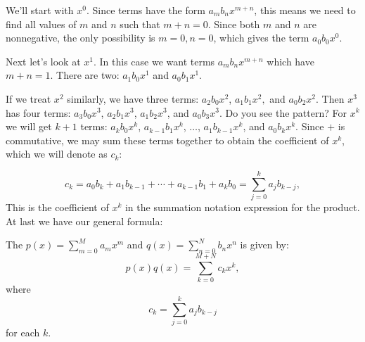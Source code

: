 We'll start with $x^0$. Since terms have the form $a_m b_n x^{m+n}$, this means we need to find all values of $m$ and $n$ such that $m+n=0$.  Since both $m$ and $n$ are nonnegative, the only possibility is $m=0,n=0$, which gives the term $a_0 b_0 x^{0}$.

Next let's look at $x^1$. In this case we want terms $a_m b_n x^{m+n}$ which have $m+n=1$.  There are two: $a_1 b_0 x^{1}$ and $a_0 b_1 x^{1}$.

If we treat $x^2$ similarly, we have three terms: $a_2 b_0 x^{2}$, $a_1 b_1 x^{2}, $  and $a_0 b_2 x^{2}$.  Then $x^3$ has four terms: $a_3 b_0 x^{3}$, $a_2 b_1 x^{3}$, $a_1b_2 x^{3}$, and  $a_0b_3x^3$.  Do you see the pattern? For $x^k$ we will get $k+1$ terms:  $a_k b_0 x^{k}$, $ a_{k-1} b_1 x^{k}$, $\ldots$, $a_1 b_{k-1} x^{k}$, and $a_0 b_{k} x^{k}$.  Since $+$ is commutative, we may sum these terms together to obtain the coefficient of $x^k$, which we will denote as $c_k$:

\[
c_k  = a_0  b_k + a_1 b_{k -1} + \cdots + a_{k -1} b _1 + a_k b_0 = \sum_{j = 0}^k a_j b_{k - j},
\]
This is the coefficient of $x^k$ in the summation notation expression for the product. At last we have our general formula:

\begin{defn}\label{defprodpoly} The  $p(x)= \sum^{M}_{m=0} a_m x^m$ and $q(x)=\sum^{N}_{n=0} b_n x^n$ is given by: 
\[
p(x) q(x) = \sum_{k=0}^{M+N} c_k x^k,
\]
where
\[
c_k=  \sum_{j = 0}^k a_j b_{k - j}
\]
for each $k$.  
\end {defn}

